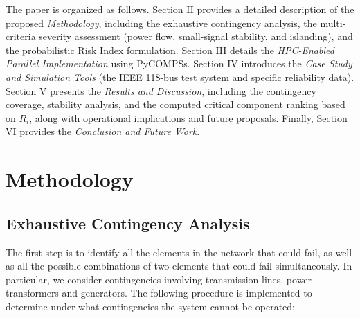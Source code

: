 \documentclass[journal]{IEEEtran}
\begin{document}

The paper is organized as follows. 
Section II provides a detailed description of the proposed \textit{Methodology}, including the exhaustive contingency analysis, the multi-criteria severity assessment (power flow, small-signal stability, and islanding), and the probabilistic Risk Index formulation. 
Section III details the \textit{HPC-Enabled Parallel Implementation} using PyCOMPSs. 
Section IV introduces the \textit{Case Study and Simulation Tools} (the IEEE 118-bus test system and specific reliability data). 
Section V presents the \textit{Results and Discussion}, including the contingency coverage, stability analysis, and the computed critical component ranking based on $R_i$, along with operational implications and future proposals. 
Finally, Section VI provides the \textit{Conclusion and Future Work}.

\section{Methodology}
\label{sec:method}

\subsection{Exhaustive Contingency Analysis}

The first step is to identify all the elements in the network that could fail, as well as all the possible combinations of two elements that could fail simultaneously. In particular, we consider contingencies involving transmission lines, power transformers and generators. The following procedure is implemented to determine under what contingencies the system cannot be operated:
\end{document}
